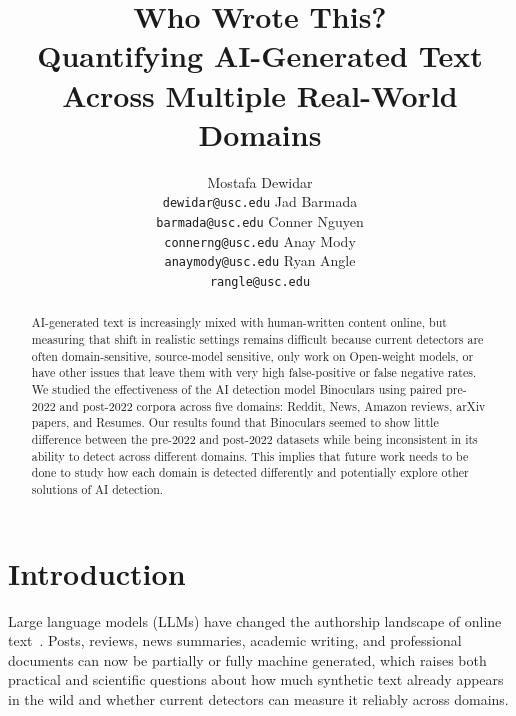 \documentclass[11pt]{article}
\title{Who Wrote This?\\
Quantifying AI-Generated Text Across Multiple Real-World Domains}
\author{
  Mostafa Dewidar \\
  \texttt{dewidar@usc.edu}
  \And
  Jad Barmada \\
  \texttt{barmada@usc.edu}
  \And
  Conner Nguyen \\
  \texttt{connerng@usc.edu}
  \And
  Anay Mody \\
  \texttt{anaymody@usc.edu}
  \And
  Ryan Angle \\
  \texttt{rangle@usc.edu}
}
\begin{document}
\maketitle

\begin{abstract}
AI-generated text is increasingly mixed with human-written content online, but
measuring that shift in realistic settings remains difficult because current
detectors are often domain-sensitive, source-model sensitive, only work on Open-weight models, or have other issues that leave them with very high false-positive or false negative rates.  We studied the effectiveness of the AI detection model Binoculars
using paired pre-2022 and post-2022 corpora across five domains: Reddit, News, Amazon reviews, arXiv papers, and Resumes. Our results found that Binoculars seemed to show little difference between the pre-2022 and post-2022 datasets while being inconsistent in its ability to detect across different domains. This implies that future work needs to be done to study how each domain is detected differently and potentially explore other solutions of AI detection.
\end{abstract}

\section{Introduction}
Large language models (LLMs) have changed the authorship landscape of online
text~\citep{brown2020gpt3}. Posts, reviews, news summaries, academic writing,
and professional documents can now be partially or fully machine generated,
which raises both practical and scientific questions about how much synthetic
text already appears in the wild and whether current detectors can measure it
reliably across domains.
\end{document}
